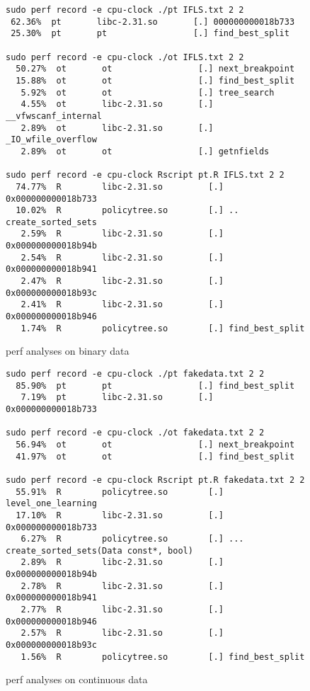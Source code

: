\documentclass{article}
\begin{document}
\begin{figure}
  \centering
\begin{verbatim}
sudo perf record -e cpu-clock ./pt IFLS.txt 2 2
 62.36%  pt       libc-2.31.so       [.] 000000000018b733
 25.30%  pt       pt                 [.] find_best_split       

sudo perf record -e cpu-clock ./ot IFLS.txt 2 2
  50.27%  ot       ot                 [.] next_breakpoint
  15.88%  ot       ot                 [.] find_best_split
   5.92%  ot       ot                 [.] tree_search
   4.55%  ot       libc-2.31.so       [.] __vfwscanf_internal
   2.89%  ot       libc-2.31.so       [.] _IO_wfile_overflow
   2.89%  ot       ot                 [.] getnfields

sudo perf record -e cpu-clock Rscript pt.R IFLS.txt 2 2 
  74.77%  R        libc-2.31.so         [.] 0x000000000018b733
  10.02%  R        policytree.so        [.] .. create_sorted_sets
   2.59%  R        libc-2.31.so         [.] 0x000000000018b94b
   2.54%  R        libc-2.31.so         [.] 0x000000000018b941
   2.47%  R        libc-2.31.so         [.] 0x000000000018b93c
   2.41%  R        libc-2.31.so         [.] 0x000000000018b946
   1.74%  R        policytree.so        [.] find_best_split
\end{verbatim}
  \caption{perf analyses on binary data}
  \label{fig:perfbinary}
\end{figure}


\begin{figure}
  \centering
\begin{verbatim}
sudo perf record -e cpu-clock ./pt fakedata.txt 2 2
  85.90%  pt       pt                 [.] find_best_split
   7.19%  pt       libc-2.31.so       [.] 0x000000000018b733

sudo perf record -e cpu-clock ./ot fakedata.txt 2 2
  56.94%  ot       ot                 [.] next_breakpoint
  41.97%  ot       ot                 [.] find_best_split

sudo perf record -e cpu-clock Rscript pt.R fakedata.txt 2 2
  55.91%  R        policytree.so        [.] level_one_learning
  17.10%  R        libc-2.31.so         [.] 0x000000000018b733
   6.27%  R        policytree.so        [.] ... create_sorted_sets(Data const*, bool)
   2.89%  R        libc-2.31.so         [.] 0x000000000018b94b
   2.78%  R        libc-2.31.so         [.] 0x000000000018b941
   2.77%  R        libc-2.31.so         [.] 0x000000000018b946
   2.57%  R        libc-2.31.so         [.] 0x000000000018b93c
   1.56%  R        policytree.so        [.] find_best_split
\end{verbatim}
  \caption{perf analyses on continuous data}
  \label{fig:perfcontinuous}
\end{figure}
\end{document}
